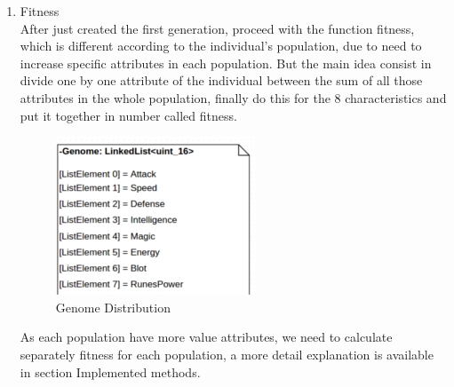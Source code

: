 \documentclass[twocolumn]{IEEEtran}
\begin{document}
\begin{enumerate} 
	\item Fitness\\
    After just created the first generation, proceed with the function fitness, which is different 
    according to the individual's population, due to need to increase specific attributes in each 	
    population. But the main idea consist in divide one by one attribute of the individual between the 
    sum of all those attributes in the whole population, finally do this for the 8 characteristics and 
    put it together in number called fitness.\cite{9} \\
    
        \begin{figure}[h!]
        \centering
        \includegraphics[width=\columnwidth]{src/cualidades.png}
		\caption{Genome Distribution}
		\end{figure}
        
        
    As each population have more value attributes, we need to calculate separately fitness for each  
    population, a more detail explanation is available in section Implemented methods.
        

\end{enumerate}
\end{document}
